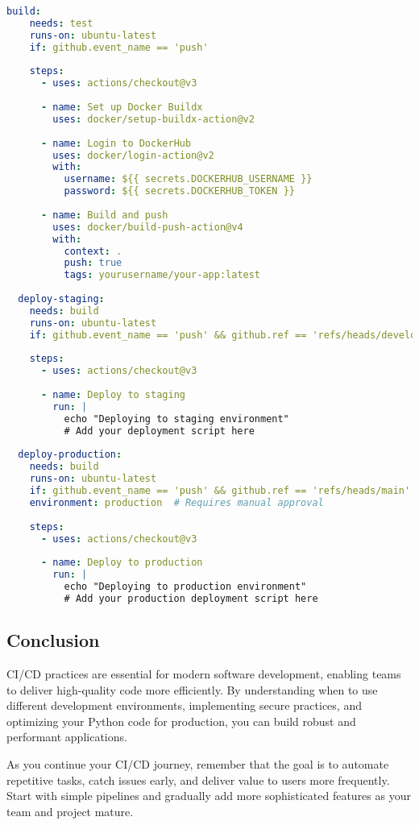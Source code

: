 \begin{lstlisting}[language=yaml, caption=Complete GitHub Actions CI/CD Pipeline]
  build:
    needs: test
    runs-on: ubuntu-latest
    if: github.event_name == 'push'
    
    steps:
      - uses: actions/checkout@v3
      
      - name: Set up Docker Buildx
        uses: docker/setup-buildx-action@v2
      
      - name: Login to DockerHub
        uses: docker/login-action@v2
        with:
          username: ${{ secrets.DOCKERHUB_USERNAME }}
          password: ${{ secrets.DOCKERHUB_TOKEN }}
      
      - name: Build and push
        uses: docker/build-push-action@v4
        with:
          context: .
          push: true
          tags: yourusername/your-app:latest
  
  deploy-staging:
    needs: build
    runs-on: ubuntu-latest
    if: github.event_name == 'push' && github.ref == 'refs/heads/develop'
    
    steps:
      - uses: actions/checkout@v3
      
      - name: Deploy to staging
        run: |
          echo "Deploying to staging environment"
          # Add your deployment script here
  
  deploy-production:
    needs: build
    runs-on: ubuntu-latest
    if: github.event_name == 'push' && github.ref == 'refs/heads/main'
    environment: production  # Requires manual approval
    
    steps:
      - uses: actions/checkout@v3
      
      - name: Deploy to production
        run: |
          echo "Deploying to production environment"
          # Add your production deployment script here
\end{lstlisting}

\subsection{Conclusion}
CI/CD practices are essential for modern software development, enabling teams to deliver high-quality code more efficiently. By understanding when to use different development environments, implementing secure practices, and optimizing your Python code for production, you can build robust and performant applications.

As you continue your CI/CD journey, remember that the goal is to automate repetitive tasks, catch issues early, and deliver value to users more frequently. Start with simple pipelines and gradually add more sophisticated features as your team and project mature.